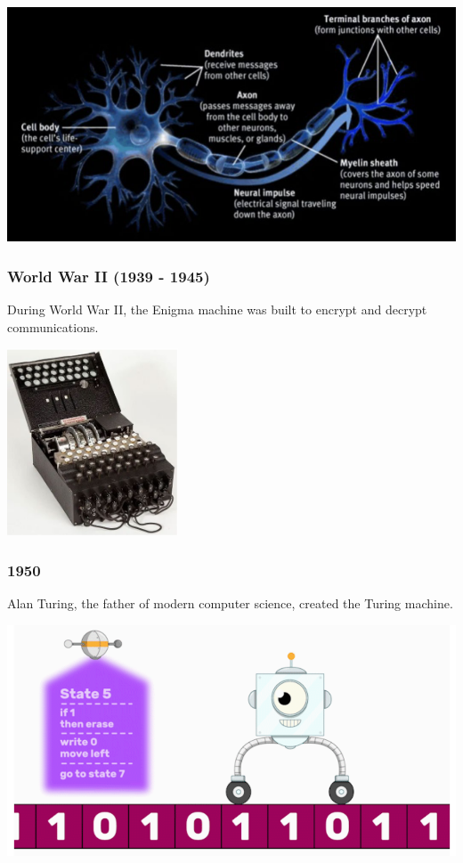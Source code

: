 \documentclass[11pt]{article}
\begin{document}
\begin{center}
\includegraphics[width=.9\linewidth]{./images/human-neuron.png}
\end{center}

 \newpage
\subsubsection{World War II (1939 - 1945)}
\label{sec:org2f0697e}
During World War II, the Enigma machine was built to encrypt and decrypt communications.

\begin{center}
\includegraphics[height=15em]{./images/enigma-machine.png}
\end{center}
\subsubsection{1950}
\label{sec:org5c47a77}
Alan Turing, the father of modern computer science, created the Turing machine.

\begin{center}
\includegraphics[width=.9\linewidth]{./images/turing-machine-graphic.png}
\end{center}
\end{document}

